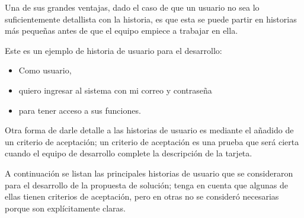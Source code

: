 Una de sus grandes ventajas, dado el caso de que un usuario no sea lo suficientemente detallista con la historia, es que esta se puede partir en historias más pequeñas antes de que el equipo empiece a trabajar en ella.


Este es un ejemplo de historia de usuario para el desarrollo:

\begin{itemize}
	\item Como usuario,
	\item quiero ingresar al sistema con mi correo y contraseña
	\item para tener acceso a sus funciones.
\end{itemize}


Otra forma de darle detalle a las historias de usuario es mediante el añadido de un criterio de aceptación; un criterio de aceptación es una prueba que será cierta cuando el equipo de desarrollo complete la descripción de la tarjeta.


A continuación se listan las principales historias de usuario que se consideraron para el desarrollo de la propuesta de solución; tenga en cuenta que algunas de ellas tienen criterios de aceptación, pero en otras no se consideró necesarias porque son explícitamente claras.


